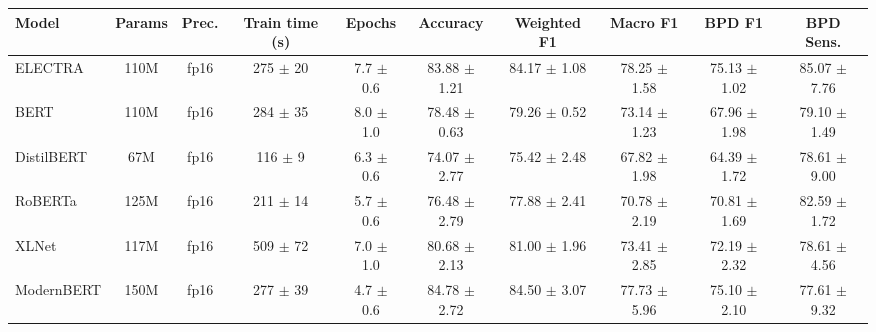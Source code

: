 \begin{tabular}{@{}lccccccccc@{}}
\toprule
\textbf{Model} & \textbf{Params} & \textbf{Prec.} & \textbf{Train time (s)} & \textbf{Epochs} & \textbf{Accuracy} & \textbf{Weighted F1} & \textbf{Macro F1} & \textbf{BPD F1} & \textbf{BPD Sens.} \\
\midrule
ELECTRA & 110M & fp16 & 275 $\pm$ 20 & 7.7 $\pm$ 0.6 & 83.88 $\pm$ 1.21 & 84.17 $\pm$ 1.08 & 78.25 $\pm$ 1.58 & 75.13 $\pm$ 1.02 & 85.07 $\pm$ 7.76 \\
BERT & 110M & fp16 & 284 $\pm$ 35 & 8.0 $\pm$ 1.0 & 78.48 $\pm$ 0.63 & 79.26 $\pm$ 0.52 & 73.14 $\pm$ 1.23 & 67.96 $\pm$ 1.98 & 79.10 $\pm$ 1.49 \\
DistilBERT & 67M & fp16 & 116 $\pm$ 9 & 6.3 $\pm$ 0.6 & 74.07 $\pm$ 2.77 & 75.42 $\pm$ 2.48 & 67.82 $\pm$ 1.98 & 64.39 $\pm$ 1.72 & 78.61 $\pm$ 9.00 \\
RoBERTa & 125M & fp16 & 211 $\pm$ 14 & 5.7 $\pm$ 0.6 & 76.48 $\pm$ 2.79 & 77.88 $\pm$ 2.41 & 70.78 $\pm$ 2.19 & 70.81 $\pm$ 1.69 & 82.59 $\pm$ 1.72 \\
XLNet & 117M & fp16 & 509 $\pm$ 72 & 7.0 $\pm$ 1.0 & 80.68 $\pm$ 2.13 & 81.00 $\pm$ 1.96 & 73.41 $\pm$ 2.85 & 72.19 $\pm$ 2.32 & 78.61 $\pm$ 4.56 \\
ModernBERT & 150M & fp16 & 277 $\pm$ 39 & 4.7 $\pm$ 0.6 & 84.78 $\pm$ 2.72 & 84.50 $\pm$ 3.07 & 77.73 $\pm$ 5.96 & 75.10 $\pm$ 2.10 & 77.61 $\pm$ 9.32 \\
\bottomrule
\end{tabular}
